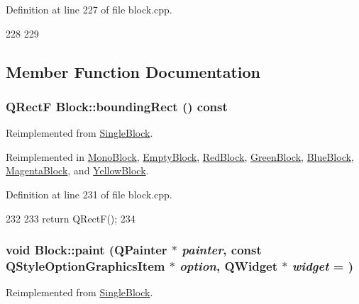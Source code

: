 Definition at line 227 of file block.cpp.


\begin{DoxyCode}
228 {
229 }
\end{DoxyCode}


\subsection{Member Function Documentation}
\hypertarget{class_block_aee4444b92a82f5a8080e9019ef1e554d}{
\subsubsection[{boundingRect}]{\setlength{\rightskip}{0pt plus 5cm}QRectF Block::boundingRect () const}}
\label{class_block_aee4444b92a82f5a8080e9019ef1e554d}


Reimplemented from \hyperlink{class_single_block_a96b8d4a017cce8eaf08a09632e7f9907}{SingleBlock}.

Reimplemented in \hyperlink{class_mono_block_ae85adc70af0318603a03c2daf768c145}{MonoBlock}, \hyperlink{class_empty_block_a1984fabb510aba7e14f460845faf881c}{EmptyBlock}, \hyperlink{class_red_block_a31036897a1451c6140ce9f368e461fb0}{RedBlock}, \hyperlink{class_green_block_a302d2bfd76e7f40196c699ae52607175}{GreenBlock}, \hyperlink{class_blue_block_ae83a63d0611bc918f93d7019b4b27056}{BlueBlock}, \hyperlink{class_magenta_block_aec892d6118a5a5030d767a5ccfc56929}{MagentaBlock}, and \hyperlink{class_yellow_block_a05f341c5d1b859d8c7b909a5cfee7601}{YellowBlock}.

Definition at line 231 of file block.cpp.


\begin{DoxyCode}
232 {
233     return QRectF();
234 }
\end{DoxyCode}
\hypertarget{class_block_a36791d086b6fad1a2203bfef6fdbaa0a}{
\subsubsection[{paint}]{\setlength{\rightskip}{0pt plus 5cm}void Block::paint (QPainter $\ast$ {\em painter}, \/  const QStyleOptionGraphicsItem $\ast$ {\em option}, \/  QWidget $\ast$ {\em widget} = {})}}
\label{class_block_a36791d086b6fad1a2203bfef6fdbaa0a}


Reimplemented from \hyperlink{class_single_block_a397006b22a2f8dc67e27660f67546880}{SingleBlock}.

